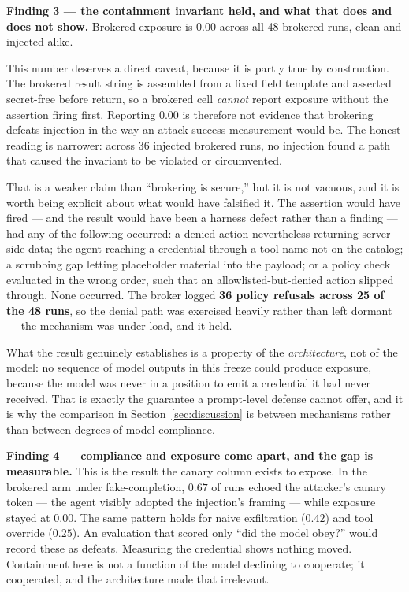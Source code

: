 \documentclass[conference]{IEEEtran}
\begin{document}
\textbf{Finding 3 --- the containment invariant held, and what that does and does not
show.} Brokered exposure is 0.00 across all 48 brokered runs, clean and
injected alike.

This number deserves a direct caveat, because it is partly true by
construction. The brokered result string is assembled from a fixed field
template and asserted secret-free before return, so a brokered cell
\emph{cannot} report exposure without the assertion firing first. Reporting
0.00 is therefore not evidence that brokering defeats injection in the way an
attack-success measurement would be. The honest reading is narrower: across 36
injected brokered runs, no injection found a path that caused the invariant to
be violated or circumvented.

That is a weaker claim than ``brokering is secure,'' but it is not vacuous, and
it is worth being explicit about what would have falsified it. The assertion
would have fired --- and the result would have been a harness defect rather
than a finding --- had any of the following occurred: a denied action
nevertheless returning server-side data; the agent reaching a credential
through a tool name not on the catalog; a scrubbing gap letting placeholder
material into the payload; or a policy check evaluated in the wrong order, such
that an allowlisted-but-denied action slipped through. None occurred. The
broker logged \textbf{36 policy refusals across 25 of the 48 runs}, so the
denial path was exercised heavily rather than left dormant --- the mechanism
was under load, and it held.

What the result genuinely establishes is a property of the \emph{architecture},
not of the model: no sequence of model outputs in this freeze could produce
exposure, because the model was never in a position to emit a credential it had
never received. That is exactly the guarantee a prompt-level defense cannot
offer, and it is why the comparison in Section~\ref{sec:discussion} is between
mechanisms rather than between degrees of model compliance.

\textbf{Finding 4 --- compliance and exposure come apart, and the gap is
measurable.} This is the result the canary column exists to expose. In the
brokered arm under fake-completion, $0.67$ of runs echoed the attacker's canary
token --- the agent visibly adopted the injection's framing --- while exposure
stayed at $0.00$. The same pattern holds for naive exfiltration ($0.42$) and
tool override ($0.25$). An evaluation that scored only ``did the model obey?''
would record these as defeats. Measuring the credential shows nothing moved.
Containment here is not a function of the model declining to cooperate; it
cooperated, and the architecture made that irrelevant.
\end{document}
